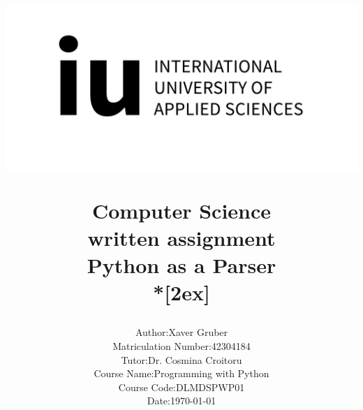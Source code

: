 \begin{titlepage}

  \title{ \centerline{\includegraphics[scale=.6,]{Bilder/iuLogo.png}} 
    {\Large
      Computer Science\\
      written assignment\\
    }
     \vspace{45pt}
      Python as a Parser\\*[2ex] 

  }
	\author{\begin{tabular}{ll}
          	Author: & Xaver Gruber \\ Matriculation Number: & 42304184 \\
            Tutor: & Dr. Cosmina Croitoru \\
            Course Name: & Programming with Python \\
            Course Code: & DLMDSPWP01 \\
            Date: & \today \\
          \end{tabular}}

  \date{}

  \maketitle
\end{titlepage}
